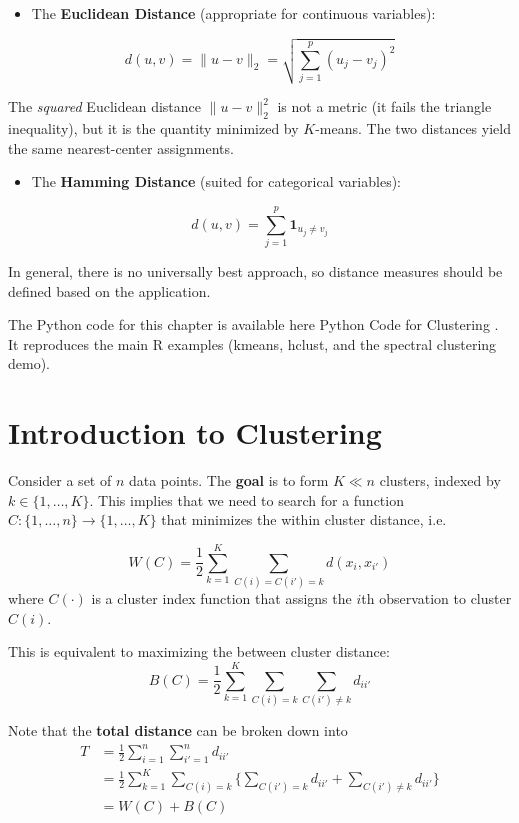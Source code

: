 \documentclass[
]{book}
\providecommand{\tightlist}{%
  \setlength{\itemsep}{0pt}\setlength{\parskip}{0pt}}
\begin{document}
\begin{itemize}
\tightlist
\item
  The \textbf{Euclidean Distance} (appropriate for continuous variables):
\end{itemize}

\[d(u,v) = \|u-v\|_2 = \sqrt{\sum_{j=1}^{p} (u_j - v_j)^2}\]

The \emph{squared} Euclidean distance \(\|u-v\|_2^2\) is not a metric (it fails the triangle inequality), but it is the quantity minimized by \(K\)-means. The two distances yield the same nearest-center assignments.

\begin{itemize}
\tightlist
\item
  The \textbf{Hamming Distance} (suited for categorical variables):
\end{itemize}

\[d(u,v) = \sum_{j=1}^{p} \mathbf{1}_{u_j \neq v_j} \]

In general, there is no universally best approach, so distance measures should be defined based on the application.

The Python code for this chapter is available here Python Code for Clustering . It reproduces the main R examples (kmeans, hclust, and the spectral clustering demo).

\section{Introduction to Clustering}\label{introduction-to-clustering}

Consider a set of \(n\) data points. The \textbf{goal} is to form \(K \ll n\) clusters, indexed by \(k \in \{1, \ldots, K\}\). This implies that we need to search for a function \(C: \{1, \ldots, n\} \rightarrow \{1, \ldots, K\}\) that minimizes the within cluster distance, i.e.

\[W(C) = \frac{1}{2} \sum_{k=1}^{K} \sum_{C(i)=C(i')=k} d(x_i, x_{i'})\]
where \(C(\cdot)\) is a cluster index function that assigns the \(i\)th observation to cluster \(C(i)\).

This is equivalent to maximizing the between cluster distance:
\[B(C) = \frac{1}{2} \sum_{k=1}^{K} \sum_{C(i)=k}\sum_{C(i') \neq k} d_{i i'}\]

Note that the \textbf{total distance} can be broken down into
\begin{align*}
T &= \frac{1}{2} \sum_{i=1}^{n} \sum_{i'=1}^{n} d_{ii'} \\
&= \frac{1}{2} \sum_{k=1}^{K} \sum_{C(i)=k} \Biggl\{ \sum_{C(i') = k} d_{i i'} + \sum_{C(i') \neq k} d_{i i'} \Biggr\}\\
&= W(C) + B(C)\\
\end{align*}
\end{document}
